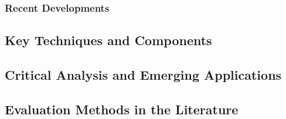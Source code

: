 \documentclass[11pt]{article}
\newif\ifguidance
\newcommand{\guidance}[1]{\ifguidance\textcolor{blue}{\small\textit{[#1]}}\fi}
\begin{document}
\begin{multicols}{2}
\guidance{%
  Drill into the specific paradigm your system builds on (e.g.\
  incremental processing, end-to-end models, retrieval-augmented
  generation). Explain the framework, its key concepts, advantages
  and limitations.}


\subsubsection{Recent Developments}

\guidance{%
  Cover the most recent and relevant work. This demonstrates thorough
  and up-to-date engagement with the literature.}


\subsection{Key Techniques and Components}
\label{sec:techniques}

\guidance{%
  Review the specific techniques your system uses (e.g.\ ASR models,
  LLM-based dialogue, slot filling, intent recognition). For each,
  discuss the state of the art and justify why you chose the approach
  you did.}


\subsection{Critical Analysis and Emerging Applications}
\label{sec:critical_analysis}

\guidance{%
  [MSc students: this sub-section is explicitly assessed. 4th-year
  students will also benefit from including it.]
  Synthesise the literature --- do not just summarise. Compare and
  contrast the approaches reviewed. What are the open problems? Where
  do current methods fall short?
  Additionally, comment on applicability: how do the technologies and
  methods discussed apply to emerging application areas (e.g.\
  multimodal assistants, healthcare, education, accessibility)?}


\subsection{Evaluation Methods in the Literature}
\label{sec:eval_literature}


\end{multicols}
\end{document}
